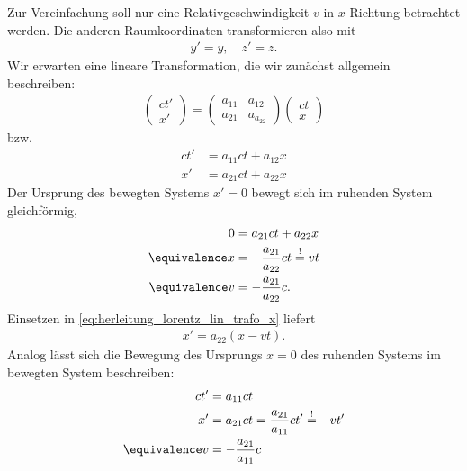 Zur Vereinfachung soll nur eine Relativgeschwindigkeit $v$ in $x$-Richtung betrachtet werden.
Die anderen Raumkoordinaten transformieren also mit
\begin{align*}
    y'=y, \quad z'=z.
\end{align*}
Wir erwarten eine lineare Transformation, die wir zunächst allgemein beschreiben:
\begin{align}
    \label{eq:herleitung_lorentz_lin_trafo}
    \begin{pmatrix} ct' \\ x' \end{pmatrix} = \begin{pmatrix} a_{11} & a_{12} \\ a_{21} & a_{a_22} \end{pmatrix} \begin{pmatrix} ct \\ x \end{pmatrix}
\end{align}
bzw.
\begin{align}
    \label{eq:herleitung_lorentz_lin_trafo_ct}
    ct' & = a_{11} ct + a_{12}x \\
    \label{eq:herleitung_lorentz_lin_trafo_x}
    x'  & = a_{21} ct + a_{22}x
\end{align}
Der Ursprung des bewegten Systems $x'=0$ bewegt sich im ruhenden System gleichförmig,
\begin{align}
    0              & = a_{21} ct + a_{22}x \nonumber                       \\
    \equivalence x & = -\frac{a_{21}}{a_{22}}ct \overset{!}{=}vt \nonumber \\
    \label{eq:herleitung_lorentz_v1}
    \equivalence v & = -\frac{a_{21}}{a_{22}} c.
\end{align}
Einsetzen in \eqref{eq:herleitung_lorentz_lin_trafo_x} liefert
\begin{align}
    \label{eq:herleitung_lorentz_xprime}
    x'=a_{22} (x-vt).
\end{align}
Analog lässt sich die Bewegung des Ursprungs $x=0$ des ruhenden Systems im bewegten System beschreiben:
\begin{align}
    ct'            & = a_{11}ct \nonumber                                                \\
    x'             & = a_{21}ct = \frac{a_{21}}{a_{11}}ct' \overset{!}{=} -vt' \nonumber \\
    \label{eq:herleitung_lorentz_v2}
    \equivalence v & =-\frac{a_{21}}{a_{11}}c
\end{align}
